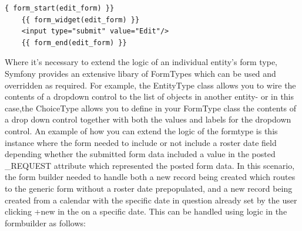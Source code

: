 \documentclass[a4paper,12pt]{article}
\begin{document}
\begin{verbatim}
{ form_start(edit_form) }}
    {{ form_widget(edit_form) }}
    <input type="submit" value="Edit"/>
    {{ form_end(edit_form) }}
\end{verbatim}
Where it's necessary to extend the logic of an individual entity's form type, Symfony provides an extensive libary of FormTypes which can be used and overridden as required. For example, the EntityType class allows you to wire the contents of a dropdown control to the list of objects in another entity- or in this case,the ChoiceType allows you to define in your FormType class the contents of a drop down control together with both the values and labels for the dropdown control. An example of how you can extend the logic of the formtype is this instance where the form needed to include or not include a roster date field depending whether the submitted form data included a value in the posted \_REQUEST attribute which represented the posted form data. In this scenario, the form builder needed to handle both a new record being created which routes to the generic form without a roster date prepopulated, and a new record being created from a calendar with the specific date in question already set by the user clicking +new in the on a specific date.
This can be handled using logic in the formbuilder as follows:
\end{document}
